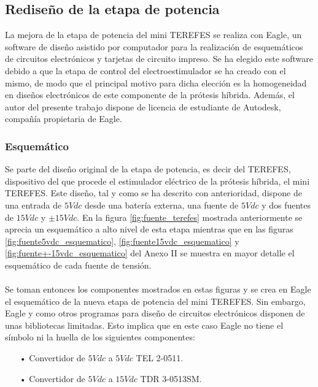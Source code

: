 \subsection{Rediseño de la etapa de potencia}
La mejora de la etapa de potencia del mini TEREFES se realiza con Eagle\cite{eagle}, un software de diseño asistido por computador para la realización de esquemáticos de circuitos electrónicos y tarjetas de circuito impreso. Se ha elegido este software debido a que la etapa de control del electroestimulador se ha creado con el mismo, de modo que el principal motivo para dicha elección es la homogeneidad en diseños electrónicos de este componente de la prótesis híbrida. Además, el autor del presente trabajo dispone de licencia de estudiante de Autodesk, compañía propietaria de Eagle.

\subsubsection{Esquemático}
Se parte del diseño original de la etapa de potencia, es decir del TEREFES, dispositivo del que procede el estimulador eléctrico de la prótesis híbrida, el mini TEREFES. Este diseño, tal y como se ha descrito con anterioridad, dispone de una entrada de $5Vdc$ desde una batería externa, una fuente de $5Vdc$ y dos fuentes de $15Vdc$ y $\pm15Vdc$. En la figura \ref{fig:fuente_terefes} mostrada anteriormente se aprecia un esquemático a alto nivel de esta etapa mientras que en las figuras \ref{fig:fuente5vdc_esquematico}, \ref{fig:fuente15vdc_esquematico} y \ref{fig:fuente+-15vdc_esquematico} del Anexo II se muestra en mayor detalle el esquemático de cada fuente de tensión. 
\\
\\
Se toman entonces los componentes mostrados en estas figuras y se crea en Eagle el esquemático de la nueva etapa de potencia del mini TEREFES. Sin embargo, Eagle y como otros programas para diseño de circuitos electrónicos disponen de unas bibliotecas limitadas. Esto implica que en este caso Eagle no tiene el símbolo ni la huella de los siguientes componentes:

\begin{itemize}
\item[•] Convertidor de $5Vdc$ a $5Vdc$ TEL 2-0511\cite{convertidor_5vdc}.
\item[•] Convertidor de $5Vdc$ a $15Vdc$ TDR 3-0513SM\cite{convertidor_15vdc}.

\end{itemize}

